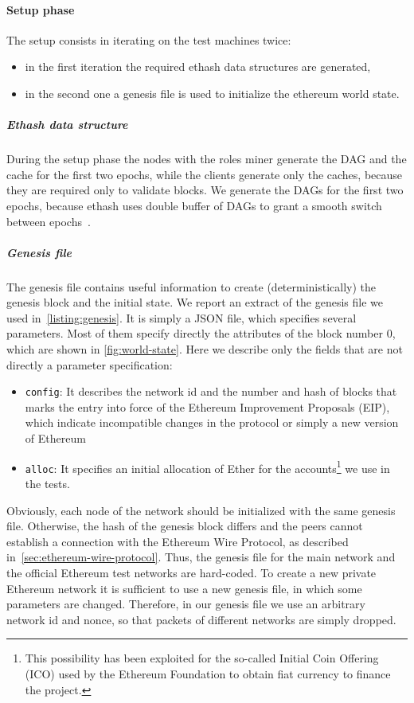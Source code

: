 \paragraph{Setup phase}
The setup consists in iterating on the test machines twice:
\begin{itemize}
  \item in the first iteration the required ethash data structures are generated,
  \item in the second one a genesis file is used to initialize the ethereum world
  state.
\end{itemize}


\subparagraph{Ethash data structure}
During the setup phase the nodes with the roles miner generate the DAG and the
cache for the first two epochs, while the clients generate only the caches,
because they are required only to validate blocks. We generate the DAGs for the
first two epochs, because ethash uses double buffer of DAGs to grant a smooth
switch between epochs~\cite{bib:dagger-hashimoto}.


\subparagraph{Genesis file}
The genesis file contains useful information to create (deterministically) the
genesis block and the initial state. We report an extract of the genesis file
we used in~\autoref{listing:genesis}. It is simply a JSON file, which specifies
several parameters. Most of them specify directly the attributes of the block
number $0$, which are shown in \autoref{fig:world-state}. Here we describe
only the fields that are not directly a parameter specification:
\begin{itemize}
    \item \texttt{config}: It describes the network id and the number and hash
    of blocks that marks the entry into force of the Ethereum Improvement 
    Proposals (EIP), which indicate incompatible changes in the protocol or
    simply a new version of Ethereum
    \item \texttt{alloc}: It specifies an initial allocation of Ether for the
    accounts\footnote{This possibility has been exploited for the so-called
    Initial Coin Offering (ICO) used by the Ethereum Foundation to obtain fiat 
    currency to finance the project.} we use in the tests.
\end{itemize}
Obviously, each node of the network should be initialized with the same genesis 
file. Otherwise, the hash of the genesis block differs and the peers cannot
establish a connection with the Ethereum Wire Protocol, as described
in~\autoref{sec:ethereum-wire-protocol}. Thus, the genesis file for the main 
network  and the official Ethereum test networks are hard-coded. To create a 
new private Ethereum network it is sufficient to use a new genesis file, in 
which some parameters are changed. Therefore, in our genesis file we use an 
arbitrary network id and nonce, so that packets of different networks are 
simply dropped.

